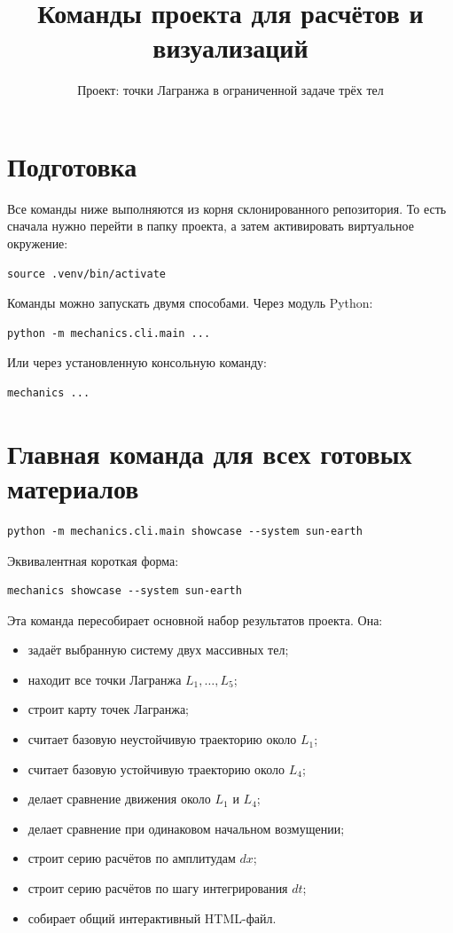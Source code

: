 \documentclass[a4paper,12pt]{article}
\title{\textbf{Команды проекта для расчётов и визуализаций}}
\author{Проект: точки Лагранжа в ограниченной задаче трёх тел}
\date{}
\begin{document}
\maketitle

\section*{Подготовка}

Все команды ниже выполняются из корня склонированного репозитория. То есть
сначала нужно перейти в папку проекта, а затем активировать виртуальное
окружение:

\begin{lstlisting}
source .venv/bin/activate
\end{lstlisting}

Команды можно запускать двумя способами. Через модуль Python:

\begin{lstlisting}
python -m mechanics.cli.main ...
\end{lstlisting}

Или через установленную консольную команду:

\begin{lstlisting}
mechanics ...
\end{lstlisting}

\section{Главная команда для всех готовых материалов}

\begin{lstlisting}
python -m mechanics.cli.main showcase --system sun-earth
\end{lstlisting}

Эквивалентная короткая форма:

\begin{lstlisting}
mechanics showcase --system sun-earth
\end{lstlisting}

Эта команда пересобирает основной набор результатов проекта. Она:

\begin{itemize}[leftmargin=1.2cm]
  \item задаёт выбранную систему двух массивных тел;
  \item находит все точки Лагранжа $L_1,\ldots,L_5$;
  \item строит карту точек Лагранжа;
  \item считает базовую неустойчивую траекторию около $L_1$;
  \item считает базовую устойчивую траекторию около $L_4$;
  \item делает сравнение движения около $L_1$ и $L_4$;
  \item делает сравнение при одинаковом начальном возмущении;
  \item строит серию расчётов по амплитудам $dx$;
  \item строит серию расчётов по шагу интегрирования $dt$;
  \item собирает общий интерактивный HTML-файл.
\end{itemize}
\end{document}
